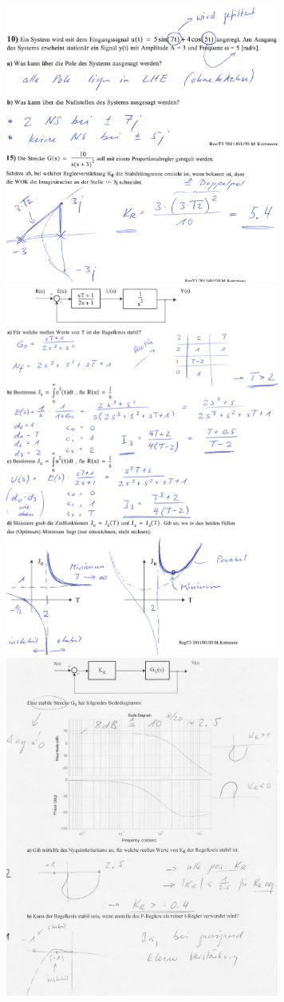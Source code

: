 \begin{multicols}{2}
\includegraphics[width=9cm]{./images/beispiele/beispiel8.png}
\includegraphics[width=9cm]{./images/beispiele/beispiel9.png}
\includegraphics[width=9cm]{./images/beispiele/beispiel10.png}
\includegraphics[width=9cm]{./images/beispiele/beispiel11.png}

\end{multicols}
